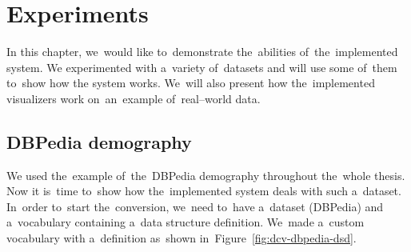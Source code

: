 \chapter{Experiments}
\label{ch:experiments}

In this chapter, we~would like to~demonstrate the~abilities of~the~implemented system. We
experimented with a~variety of~datasets and will use some of~them to~show how 
the system works. We~will also present how the~implemented visualizers work on~an~example of~real--world data.

\section{DBPedia demography}
We used the~example of~the~DBPedia demography throughout the~whole thesis. Now 
it is~time to~show how the~implemented system deals with such a~dataset. In~order to~start the~conversion, we~need to~have a~dataset (DBPedia) and a~vocabulary containing a~data structure definition. We~made a~custom vocabulary 
with a~definition as~shown in~Figure~\ref{fig:dcv-dbpedia-dsd}.

